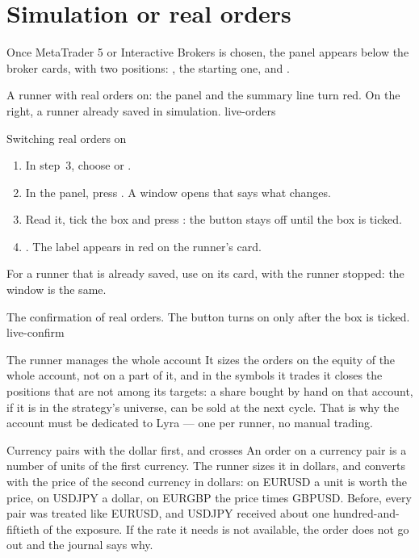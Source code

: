 \section{Simulation or real orders}\label{sez:real-orders}

Once MetaTrader 5 or Interactive Brokers is chosen, the  panel
appears below the broker cards, with two positions: , the
starting one, and .

  {A runner with real orders on: the  panel and the summary line
   turn red. On the right, a runner already saved in simulation.}
  {live-orders}

\begin{pratica}{Switching real orders on}
\begin{enumerate}
  \item In step~\num{3}, choose  or
        .
  \item In the  panel, press . A window opens
        that says what changes.
  \item Read it, tick the box and press : the
        button stays off until the box is ticked.
  \item {}. The  label appears in red on
        the runner's card.
\end{enumerate}
For a runner that is already saved, use 
on its card, with the runner stopped: the window is the same.
\end{pratica}

  {The confirmation of real orders. The button turns on only after the box is
   ticked.}
  {live-confirm}

\begin{attenzione}{The runner manages the whole account}
It sizes the orders on the equity of the whole account, not on a part of
it, and in the symbols it trades it closes the positions that are not among
its targets: a share bought by hand on that account, if it is in the
strategy's universe, can be sold at the next cycle. That is why the account
must be dedicated to Lyra --- one per runner, no manual trading.
\end{attenzione}

\begin{nota}{Currency pairs with the dollar first, and crosses}
An order on a currency pair is a number of units of the first currency. The
runner sizes it in dollars, and converts with the price of the second
currency in dollars: on EURUSD a unit is worth the price, on USDJPY a
dollar, on EURGBP the price times GBPUSD. Before, every pair was treated like
EURUSD, and USDJPY received about one hundred-and-fiftieth of the exposure.
If the rate it needs is not available, the order does not go out and the
journal says why.
\end{nota}

